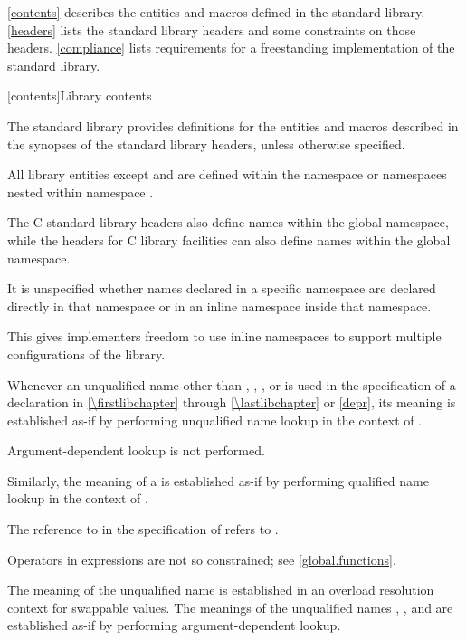 \pnum
\ref{contents} describes the entities and macros defined in the \Cpp{} standard library.
\ref{headers} lists the standard library headers and some constraints on those headers.
\ref{compliance} lists requirements for a freestanding implementation of the \Cpp{}
standard library.

[contents]{Library contents}

\pnum
The \Cpp{} standard library provides definitions
for the entities and macros described in the synopses
of the \Cpp{} standard library headers,
unless otherwise specified.

\pnum
All library entities except
and
are defined within the namespace
or namespaces nested within namespace
.
\begin{footnote}
The C standard library headers also define
names within the global namespace, while the \Cpp{} headers for C library
facilities can also define names within the global namespace.
\end{footnote}
It is unspecified whether names declared in a specific namespace are declared
directly in that namespace or in an inline namespace inside that
namespace.
\begin{footnote}
This gives implementers freedom to use inline namespaces to
support multiple configurations of the library.
\end{footnote}

\pnum
Whenever an unqualified name other than
, , , or
is used in the specification of a declaration 
in \ref{\firstlibchapter} through \ref{\lastlibchapter} or \ref{depr},
its meaning is established
as-if by performing unqualified name lookup
in the context of .
\begin{note}
Argument-dependent lookup is not performed.
\end{note}
Similarly, the meaning of a  is established
as-if by performing qualified name lookup
in the context of .
\begin{example}
The reference to  in the specification of  refers to .
\end{example}
\begin{note}
Operators in expressions are not so constrained;
see \ref{global.functions}.
\end{note}
The meaning of the unqualified name  is established
in an overload resolution context
for swappable values.
The meanings of the unqualified names
, , and
are established
as-if by performing argument-dependent lookup.


